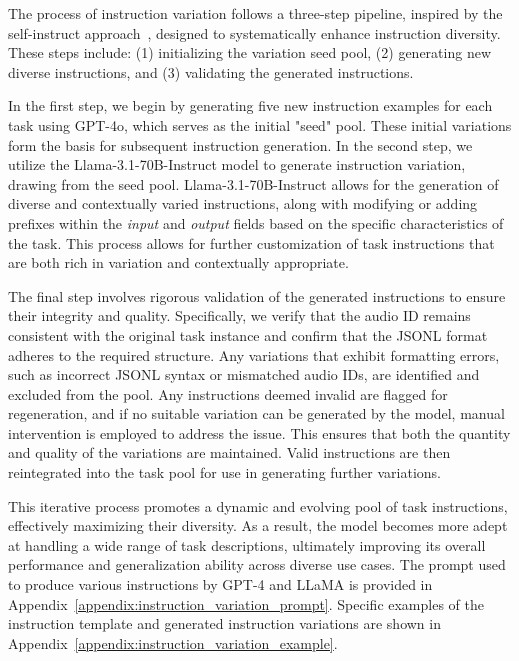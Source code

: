 The process of instruction variation follows a three-step pipeline, inspired by the self-instruct approach~\citep{wang2023self}, designed to systematically enhance instruction diversity. These steps include: (1) initializing the variation seed pool, (2) generating new diverse instructions, and (3) validating the generated instructions.

In the first step, we begin by generating five new instruction examples for each task using GPT-4o, which serves as the initial "seed" pool. These initial variations form the basis for subsequent instruction generation. In the second step, we utilize the Llama-3.1-70B-Instruct model to generate instruction variation, drawing from the seed pool. Llama-3.1-70B-Instruct allows for the generation of diverse and contextually varied instructions, along with modifying or adding prefixes within the \textit{input} and \textit{output} fields based on the specific characteristics of the task. This process allows for further customization of task instructions that are both rich in variation and contextually appropriate.

The final step involves rigorous validation of the generated instructions to ensure their integrity and quality. Specifically, we verify that the audio ID remains consistent with the original task instance and confirm that the JSONL format adheres to the required structure. Any variations that exhibit formatting errors, such as incorrect JSONL syntax or mismatched audio IDs, are identified and excluded from the pool. Any instructions deemed invalid are flagged for regeneration, and if no suitable variation can be generated by the model, manual intervention is employed to address the issue. This ensures that both the quantity and quality of the variations are maintained. Valid instructions are then reintegrated into the task pool for use in generating further variations. 

This iterative process promotes a dynamic and evolving pool of task instructions, effectively maximizing their diversity. As a result, the model becomes more adept at handling a wide range of task descriptions, ultimately improving its overall performance and generalization ability across diverse use cases. 
The prompt used to produce various instructions by GPT-4 and LLaMA is provided in Appendix~\ref{appendix:instruction_variation_prompt}. Specific examples of the instruction template and generated instruction variations are shown in Appendix~\ref{appendix:instruction_variation_example}.





